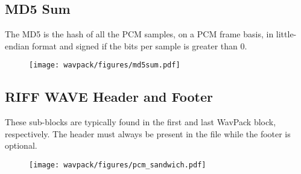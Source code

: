 \clearpage

\subsection{MD5 Sum}
\label{wavpack:md5_sum}
The MD5 is the hash of all the PCM samples, on a PCM frame basis,
in little-endian format and signed if the bits per sample is greater than 0.

\begin{figure}[h]
\texttt{[image: wavpack/figures/md5sum.pdf]}
\end{figure}

\subsection{RIFF WAVE Header and Footer}

These sub-blocks are typically found in the first and last
WavPack block, respectively.
The header must always be present in the file while
the footer is optional.

\begin{figure}[h]
\texttt{[image: wavpack/figures/pcm\_sandwich.pdf]}
\end{figure}

